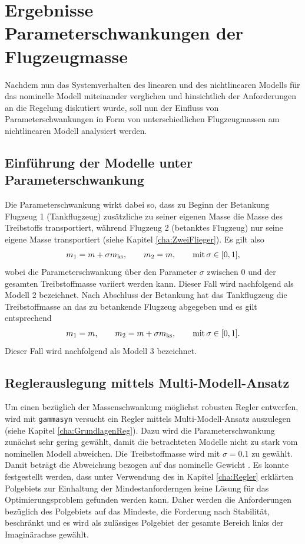 \section{Ergebnisse Parameterschwankungen der Flugzeugmasse}\label{sec:Parameterschwankungen}
Nachdem nun das Systemverhalten des linearen und des nichtlinearen Modells für das nominelle Modell miteinander verglichen und hinsichtlich der Anforderungen an die Regelung diskutiert wurde, soll nun der Einfluss von Parameterschwankungen in Form von unterschiedlichen Flugzeugmassen am nichtlinearen Modell analysiert werden. 
\subsection{Einführung der Modelle unter Parameterschwankung}
Die Parameterschwankung wirkt dabei so, dass zu Beginn der Betankung Flugzeug 1 (Tankflugzeug) zusätzliche zu seiner eigenen Masse die Masse des Treibstoffs transportiert, während Flugzeug 2 (betanktes Flugzeug) nur seine eigene Masse transportiert (siehe Kapitel \ref{cha:ZweiFlieger}). Es gilt also 
\begin{align}
	m_1 = m + \sigma m_{\textnormal{ks}}, \qquad m_2 = m, \qquad \textnormal{mit} \, \sigma\in\lbrack0,1\rbrack,
\label{eq:massmodel1}
\end{align}
wobei die Parameterschwankung über den Parameter $\sigma$ zwischen 0 und  der gesamten Treibstoffmasse variiert werden kann. Dieser Fall wird nachfolgend als Modell 2 bezeichnet.
Nach Abschluss der Betankung hat das Tankflugzeug die Treibstoffmasse an das zu betankende Flugzeug abgegeben und es gilt entsprechend
\begin{align}
	m_1 = m , \qquad m_2 = m + \sigma m_{\textnormal{ks}}, \qquad \textnormal{mit} \, \sigma\in\lbrack0,1\rbrack.
\label{eq:massmodel2}
\end{align}
Dieser Fall wird nachfolgend als Modell 3 bezeichnet.

\subsection{Reglerauslegung mittels Multi-Modell-Ansatz}
Um einen bezüglich der Massenschwankung möglichst robusten Regler entwerfen, wird mit \texttt{gammasyn} versucht ein Regler mittels Multi-Modell-Ansatz auszulegen (siehe Kapitel \ref{cha:GrundlagenReg}). Dazu wird die Parameterschwankung zunächst sehr gering gewählt, damit die betrachteten Modelle nicht zu stark vom nominellen Modell abweichen. Die Treibstoffmasse wird mit $\sigma=0.1$ zu  gewählt. Damit beträgt die Abweichung bezogen auf das nominelle Gewicht . Es konnte festgestellt werden, dass unter Verwendung des in Kapitel \ref{cha:Regler} erklärten Polgebiets zur Einhaltung der Mindestanforderngen keine Lösung für das Optimierungsproblem gefunden werden kann. Daher werden die Anforderungen bezüglich des Polgebiets auf das Mindeste, die Forderung nach Stabilität, beschränkt und es wird als zulässiges Polgebiet der gesamte Bereich links der Imaginärachse gewählt. 

